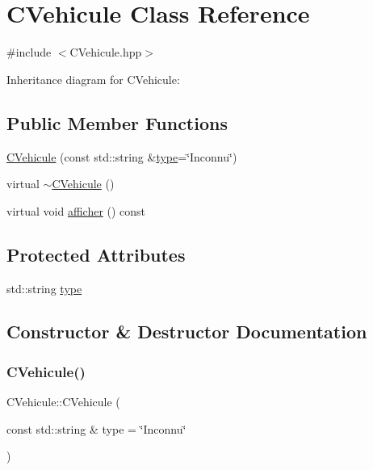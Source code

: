 \hypertarget{classCVehicule}{}\section{C\+Vehicule Class Reference}
\label{classCVehicule}


{\ttfamily \#include $<$C\+Vehicule.\+hpp$>$}



Inheritance diagram for C\+Vehicule\+:
\subsection*{Public Member Functions}
\begin{DoxyCompactItemize}
\item 
\hyperlink{classCVehicule_a05c0b5b9a9a96f5c6f9973e85e713d7a}{C\+Vehicule} (const std\+::string \&\hyperlink{classCVehicule_aade35613ce26b4263d09d39889604022}{type}=\char`\"{}Inconnu\char`\"{})
\item 
virtual \hyperlink{classCVehicule_a149e48f61193e22310c87a418f11fcc3}{$\sim$\+C\+Vehicule} ()
\item 
virtual void \hyperlink{classCVehicule_a7d62fa555949feb096b4f56781164895}{afficher} () const
\end{DoxyCompactItemize}
\subsection*{Protected Attributes}
\begin{DoxyCompactItemize}
\item 
std\+::string \hyperlink{classCVehicule_aade35613ce26b4263d09d39889604022}{type}
\end{DoxyCompactItemize}


\subsection{Constructor \& Destructor Documentation}
\mbox{\label{classCVehicule_a05c0b5b9a9a96f5c6f9973e85e713d7a}} 
\subsubsection{\texorpdfstring{C\+Vehicule()}{CVehicule()}}
{\footnotesize\ttfamily C\+Vehicule\+::\+C\+Vehicule (\begin{DoxyParamCaption}\item[{const std\+::string \&}]{type = {\ttfamily \char`\"{}Inconnu\char`\"{}} }\end{DoxyParamCaption})}

